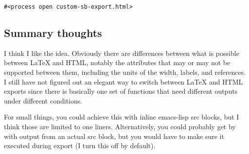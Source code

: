 \documentclass[11pt]{article}
\begin{document}
\begin{verbatim}
#<process open custom-sb-export.html>
\end{verbatim}

\subsection{Summary thoughts}
\label{sec-1-3}
I think I like the idea. Obviously there are differences between what is possible between \LaTeX{} and HTML, notably the attributes that may or may not be supported between them, including the units of the width, labels, and references. I still have not figured out an elegant way to switch between \LaTeX{} and HTML exports since there is basically one set of functions that need different outputs under different conditions.

For small things, you could achieve this with inline emacs-lisp src blocks, but I think those are limited to one liners. Alternatively, you could probably get by with output from an actual src block, but you would have to make sure it executed during export (I turn this off by default).
\end{document}
